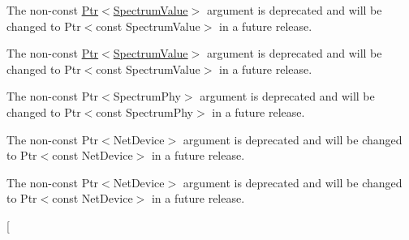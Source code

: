\begin{DoxyRefList}
\item[\label{deprecated__deprecated000021}%
\hypertarget{deprecated__deprecated000021}{}%
Member \hyperlink{classns3_1_1LteEnbPhy_ab0680f139d0eb336e9d1d3dffcee80a1}{ns3\+:\+:Lte\+Enb\+Phy\+:\+:m\+\_\+report\+Interference\+Trace} ]The non-\/const {\ttfamily \hyperlink{classns3_1_1Ptr}{Ptr$<$\+Spectrum\+Value$>$}} argument is deprecated and will be changed to {\ttfamily Ptr$<$const Spectrum\+Value$>$} in a future release.  
\item[\label{deprecated__deprecated000020}%
\hypertarget{deprecated__deprecated000020}{}%
Member \hyperlink{classns3_1_1LteEnbPhy_ae482b6691c7f55adf7ae82ea64e61d72}{ns3\+:\+:Lte\+Enb\+Phy\+:\+:Report\+Interference\+Traced\+Callback} )(uint16\+\_\+t cell\+Id, \hyperlink{classns3_1_1Ptr}{Ptr$<$ Spectrum\+Value $>$} spectrum\+Value)]The non-\/const {\ttfamily \hyperlink{classns3_1_1Ptr}{Ptr$<$\+Spectrum\+Value$>$}} argument is deprecated and will be changed to {\ttfamily Ptr$<$const Spectrum\+Value$>$} in a future release.  
\item[\label{deprecated__deprecated000031}%
\hypertarget{deprecated__deprecated000031}{}%
Member \hyperlink{classns3_1_1MultiModelSpectrumChannel_ab3333c1804de2472073cf3725f6f7f59}{ns3\+:\+:Multi\+Model\+Spectrum\+Channel\+:\+:m\+\_\+path\+Loss\+Trace} ]The non-\/const {\ttfamily Ptr$<$\+Spectrum\+Phy$>$} argument is deprecated and will be changed to {\ttfamily Ptr$<$const Spectrum\+Phy$>$} in a future release.  
\item[\label{deprecated__deprecated000025}%
\hypertarget{deprecated__deprecated000025}{}%
Member \hyperlink{classns3_1_1PointToPointChannel_ab6758265946f321dc3d2d36040902eb6}{ns3\+:\+:Point\+To\+Point\+Channel\+:\+:m\+\_\+txrx\+Point\+To\+Point} ]The non-\/const {\ttfamily Ptr$<$\+Net\+Device$>$} argument is deprecated and will be changed to {\ttfamily Ptr$<$const Net\+Device$>$} in a future release.  
\item[\label{deprecated__deprecated000024}%
\hypertarget{deprecated__deprecated000024}{}%
Member \hyperlink{classns3_1_1PointToPointChannel_aa7858042c262456ac1cf8ac9b2064d64}{ns3\+:\+:Point\+To\+Point\+Channel\+:\+:Tx\+Rx\+Animation\+Callback} )(Ptr$<$ const Packet $>$ packet, Ptr$<$ Net\+Device $>$ tx\+Device, Ptr$<$ Net\+Device $>$ rx\+Device, \hyperlink{classns3_1_1Time}{Time} duration, \hyperlink{classns3_1_1Time}{Time} last\+Bit\+Time)]The non-\/const {\ttfamily Ptr$<$\+Net\+Device$>$} argument is deprecated and will be changed to {\ttfamily Ptr$<$const Net\+Device$>$} in a future release.  
\item[\label{deprecated__deprecated000003}%

\end{DoxyRefList}
